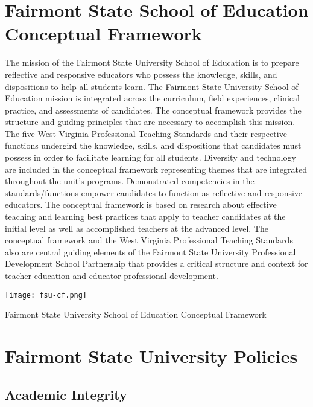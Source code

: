 \section{Fairmont State School of Education Conceptual Framework}
The mission of the Fairmont State University School of Education is to prepare reflective and responsive educators who possess the knowledge, skills, and dispositions to help all students learn. The Fairmont State University School of Education mission is integrated across the curriculum, field experiences, clinical practice, and assessments of candidates. The conceptual framework provides the structure and guiding principles that are necessary to accomplish this mission. The five West Virginia Professional Teaching Standards and their respective functions undergird the knowledge, skills, and dispositions that candidates must possess in order to facilitate learning for all students. Diversity and technology are included in the conceptual framework representing themes that are integrated throughout the unit's programs. Demonstrated competencies in the standards/functions empower candidates to function as reflective and responsive educators. The conceptual framework is based on research about effective teaching and learning best practices that apply to teacher candidates at the initial level as well as accomplished teachers at the advanced level. The conceptual framework and the West Virginia Professional Teaching Standards also are central guiding elements of the Fairmont State University Professional Development School Partnership that provides a critical structure and context for teacher education and educator professional development.

\begin{marginfigure}%
	\begin{center}
		{\texttt{[image: fsu-cf.png]}}
  		\caption{Fairmont State University School of Education Conceptual Framework}
  		\label{fig:fsu-cf}
	\end{center}
\end{marginfigure}%

\section{Fairmont State University Policies}

\subsection{Academic Integrity}

